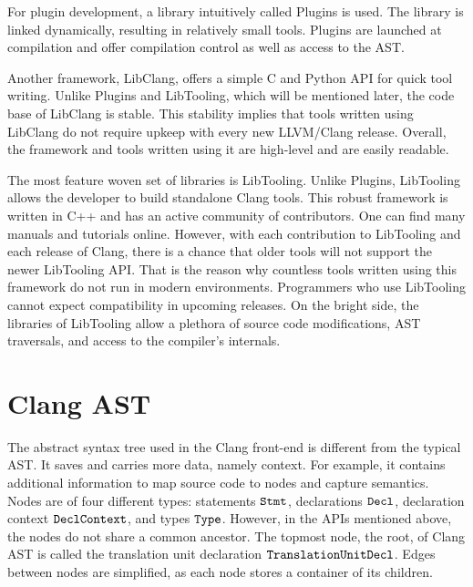 For plugin development, a library intuitively called Plugins is used. 
The library is linked dynamically, resulting in relatively small tools. 
Plugins are launched at compilation and offer compilation control 
as well as access to the AST. 

Another framework, LibClang, offers a simple C and Python API for quick 
tool writing. 
Unlike Plugins and LibTooling, which will be mentioned later, the code 
base of LibClang is stable. 
This stability implies that tools written using LibClang do not require
upkeep with every new LLVM/Clang release. 
Overall, the framework and tools written using it are high-level and 
are easily readable.

The most feature woven set of libraries is LibTooling. 
Unlike Plugins, LibTooling allows the developer to build standalone 
Clang tools. 
This robust framework is written in C++ and has an active 
community of contributors. 
One can find many manuals and tutorials online. 
However, with each contribution to LibTooling and each release of Clang, 
there is a chance that older tools will not support the newer LibTooling 
API. 
That is the reason why countless tools written using this framework do not
run in modern environments. 
Programmers who use LibTooling cannot expect compatibility in upcoming 
releases. 
On the bright side, the libraries of LibTooling allow a plethora of source
code modifications, AST traversals, and access to the compiler's internals.

\section{Clang AST}

The abstract syntax tree used in the Clang front-end is different 
from the typical AST. 
It saves and carries more data, namely context.  
For example, it contains additional information to map source 
code to nodes and capture semantics.
Nodes are of four different types: statements \(\texttt{Stmt}\), 
declarations \(\texttt{Decl}\), declaration context \(\texttt{DeclContext}\),
and types \(\texttt{Type}\). 
However, in the APIs mentioned above, the nodes do not share
a common ancestor. 
The topmost node, the root, of Clang AST is called the translation
unit declaration \(\texttt{TranslationUnitDecl}\). 
Edges between nodes are simplified, as each node stores 
a container of its children.


